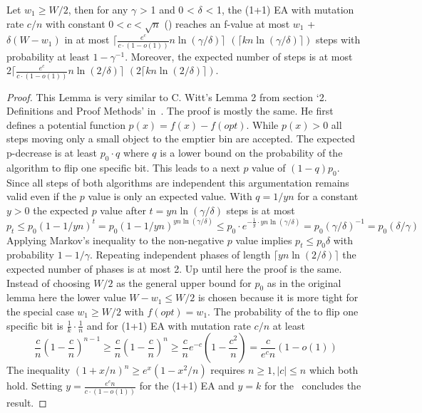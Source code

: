 \begin{lemma}\label{lemma:CWittRefined}
    Let $w_1\ge W/2$, then for any $\gamma$ > 1 and 0 < $\delta$ < 1, the (1+1) EA with mutation rate $c/n$ with constant $0<c<\sqrt{n}$ (\RLSR[k]) reaches an f-value at most $w_1$ + $\delta(W-w_1)$ in at most $\lceil\frac{e^c}{c\cdot(1-o(1))}n\ln(\gamma/\delta)\rceil$ $(\lceil kn\ln(\gamma/\delta)\rceil)$ steps with probability at least $1-\gamma^{-1}$. Moreover, the expected number of steps is at most $2\lceil\frac{e^c}{c\cdot(1-o(1))}n\ln(2/\delta)\rceil$ $(2\lceil kn\ln(2/\delta)\rceil)$.
\end{lemma}
\begin{proof}
    This Lemma is very similar to C. Witt's  Lemma 2 from section `2. Definitions and Proof Methods' in~\cite{witt2005worst}.
    The proof is mostly the same.
    He first defines a potential function $p(x)=f(x)-f(opt)$.
    While $p(x)>0$ all steps moving only a small object to the emptier bin are accepted.
    The expected p-decrease is at least $p_0\cdot q$ where $q$ is a lower bound on the probability of the algorithm to flip one specific bit.
    This leads to a next $p$ value of $(1-q)p_0$.
    Since all steps of both algorithms are independent this argumentation remains valid even if the $p$ value is only an expected value.
    With $q=1/yn$ for a constant $y>0$ the expected $p$ value after $t=yn\ln(\gamma/\delta)$ steps is at most
    \[p_t\le p_0{(1-1/yn)}^t=p_0{(1-1/yn)}^{yn\ln(\gamma/\delta)}\le p_0\cdot e^{-\frac{1}{y}\cdot yn\ln(\gamma/\delta)}=p_0{(\gamma/\delta)}^{-1} = p_0(\delta/\gamma)\]
    Applying Markov's inequality to the non-negative $p$ value implies $p_t\le p_0\delta$ with probability $1-1/\gamma$.
    Repeating independent phases of length $\lceil yn\ln(2/\delta)\rceil$ the expected number of phases is at most 2.
    Up until here the proof is the same.\newline
    Instead of choosing $W/2$ as the general upper bound for $p_0$ as in the original lemma here the lower value $W-w_1\le W/2$ is chosen because it is more tight for the special case $w_1\ge W/2$ with $f(opt)=w_1$.
    The probability of the \RLSR[k] to flip one specific bit is \(\frac{1}{k}\cdot\frac{1}{n}\) and for (1+1) EA with mutation rate $c/n$ at least
    \[
        \frac{c}{n}{(1-\frac{c}{n})}^{n-1}
        \ge \frac{c}{n}{(1-\frac{c}{n})}^{n}
        \ge \frac{c}{n}e^{-c}(1-\frac{c^2}{n})
        = \frac{c}{e^c n}(1-o(1))
    \]
    The inequality \({(1+x/n)}^n\ge e^x (1-{x^2}/n)\) requires $n\ge1, |c|\le n$ which both hold.
    Setting $y=\frac{e^c n}{c\cdot(1-o(1))}$ for the (1+1) EA and $y=k$ for the \RLSR~concludes the result.
\end{proof}


